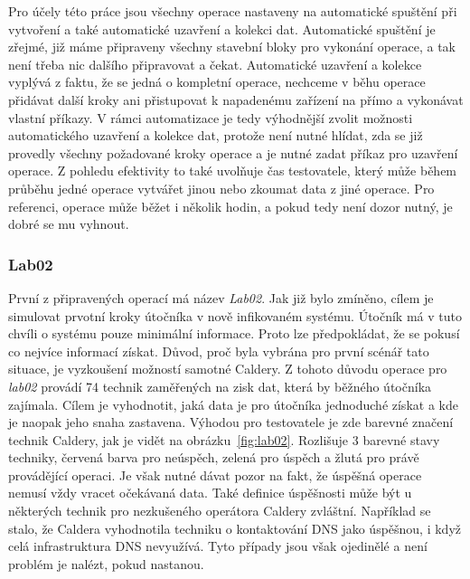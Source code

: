 
Pro účely této práce jsou všechny operace nastaveny na automatické spuštění při vytvoření a také automatické uzavření a kolekci dat.
Automatické spuštění je zřejmé, již máme připraveny všechny stavební bloky pro vykonání operace, a tak není třeba nic dalšího připravovat a čekat.
Automatické uzavření a kolekce vyplývá z faktu, že se jedná o kompletní operace, nechceme v běhu operace přidávat další kroky ani přistupovat k napadenému zařízení na přímo a vykonávat vlastní příkazy.
V rámci automatizace je tedy výhodnější zvolit možnosti automatického uzavření a kolekce dat, protože není nutné hlídat, zda se již provedly všechny požadované kroky operace a je nutné zadat příkaz pro uzavření operace.
Z pohledu efektivity to také uvolňuje čas testovatele, který může během průběhu jedné operace vytvářet jinou nebo zkoumat data z jiné operace.
Pro referenci, operace může běžet i několik hodin, a pokud tedy není dozor nutný, je dobré se mu vyhnout.

\subsubsection{Lab02}
První z připravených operací má název \textit{Lab02}.
Jak již bylo zmíněno, cílem je simulovat prvotní kroky útočníka v nově infikovaném systému.
Útočník má v tuto chvíli o systému pouze minimální informace.
Proto lze předpokládat, že se pokusí co nejvíce informací získat.
Důvod, proč byla vybrána pro první scénář tato situace, je vyzkoušení možností samotné Caldery.
Z tohoto důvodu operace pro \textit{lab02} provádí 74 technik zaměřených na zisk dat, která by běžného útočníka zajímala.
Cílem je vyhodnotit, jaká data je pro útočníka jednoduché získat a kde je naopak jeho snaha zastavena.
Výhodou pro testovatele je zde barevné značení technik Caldery, jak je vidět na obrázku~\ref{fig:lab02}.
Rozlišuje 3 barevné stavy techniky, červená barva pro neúspěch, zelená pro úspěch a žlutá pro právě provádějící operaci.
Je však nutné dávat pozor na fakt, že úspěšná operace nemusí vždy vracet očekávaná data.
Také definice úspěšnosti může být u některých technik pro nezkušeného operátora Caldery zvláštní.
Například se stalo, že Caldera vyhodnotila techniku o kontaktování \ac{DNS} jako úspěšnou, i když celá infrastruktura \ac{DNS} nevyužívá.
Tyto případy jsou však ojedinělé a není problém je nalézt, pokud nastanou.


